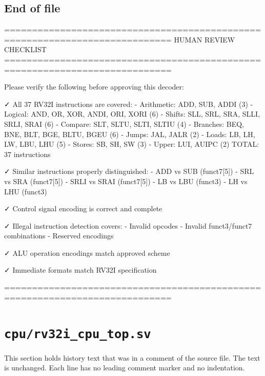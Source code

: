 \begin{record}

\subsection*{End of file}

\begin{textblock}
============================================================================
HUMAN REVIEW CHECKLIST
============================================================================

Please verify the following before approving this decoder:

✓ All 37 RV32I instructions are covered:
  - Arithmetic: ADD, SUB, ADDI (3)
  - Logical: AND, OR, XOR, ANDI, ORI, XORI (6)
  - Shifts: SLL, SRL, SRA, SLLI, SRLI, SRAI (6)
  - Compare: SLT, SLTU, SLTI, SLTIU (4)
  - Branches: BEQ, BNE, BLT, BGE, BLTU, BGEU (6)
  - Jumps: JAL, JALR (2)
  - Loads: LB, LH, LW, LBU, LHU (5)
  - Stores: SB, SH, SW (3)
  - Upper: LUI, AUIPC (2)
  TOTAL: 37 instructions

✓ Similar instructions properly distinguished:
  - ADD vs SUB (funct7[5])
  - SRL vs SRA (funct7[5])
  - SRLI vs SRAI (funct7[5])
  - LB vs LBU (funct3)
  - LH vs LHU (funct3)

✓ Control signal encoding is correct and complete

✓ Illegal instruction detection covers:
  - Invalid opcodes
  - Invalid funct3/funct7 combinations
  - Reserved encodings

✓ ALU operation encodings match approved scheme

✓ Immediate formats match RV32I specification

============================================================================
\end{textblock}

\end{record}

\section{\texttt{cpu/rv32i\_cpu\_top.sv}}\label{cr:mod:rv32i-cpu-top}

This section holds history text that was in a comment of the source file. The text is unchanged. Each line has no leading comment marker and no indentation.

